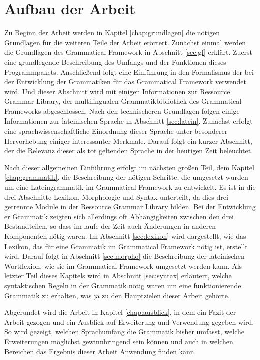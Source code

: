 \documentclass[fontsize=12pt,abstract=on,titlepage,bibliography=totoc,ngerman,listof=totoc]{scrreprt}
\begin{document}
\section{Aufbau der Arbeit}
\label{sec:aufbau}
Zu Beginn der Arbeit werden in Kapitel \ref{chap:grundlagen} die nötigen Grundlagen für die weiteren Teile der Arbeit erörtert. Zunächst einmal werden die Grundlagen des Grammatical Framework in Abschnitt \ref{sec:gf} erklärt. Zuerst eine grundlegende Beschreibung des Umfangs und der Funktionen dieses Programmpakets. Anschließend folgt eine Einführung in den Formalismus der bei der Entwicklung der Grammatiken für das Grammatical Framework verwendet wird. Und dieser Abschnitt wird mit einigen Informationen zur Ressource Grammar Library, der multilingualen Grammatikbibliothek des Grammatical Frameworks abgeschlossen. Nach den technischeren Grundlagen folgen einige Informationen zur lateinischen Sprache in Abschnitt \ref{sec:latein}. Zunächst erfolgt eine sprachwissenschaftliche Einordnung dieser Sprache unter besonderer Hervorhebung einiger interessanter Merkmale. Darauf folgt ein kurzer Abschnitt, der die Relevanz dieser als tot geltenden Sprache in der heutigen Zeit beleuchtet. \par
Nach dieser allgemeinen Einführung erfolgt im nächsten großen Teil, dem Kapitel \ref{chap:grammatik}, die Beschreibung der nötigen Schritte, die umgesetzt wurden um eine Lateingrammatik im Grammatical Framework zu entwickelt. Es ist in die drei Abschnitte Lexikon, Morphologie und Syntax unterteilt, da dies drei getrennte Module in der Ressource Grammar Library bilden. Bei der Entwicklung er Grammatik zeigten sich allerdings oft Abhängigkeiten zwischen den drei Bestandteilen, so dass im laufe der Zeit auch Änderungen in anderen Komponenten nötig waren. Im Abschnitt \ref{sec:lexikon} wird dargestellt, wie das Lexikon, das für eine Grammatik im Grammatical Framework nötig ist, erstellt wird. Darauf folgt in Abschnitt \ref{sec:morpho} die Beschreibung der lateinischen Wortflexion, wie sie im Grammatical Framework umgesetzt werden kann. Als letzter Teil dieses Kapitels wird in Abschnitt \ref{sec:syntax} erläutert, welche syntaktischen Regeln in der Grammatik nötig waren um eine funktionierende Grammatik zu erhalten, was ja zu den Hauptzielen dieser Arbeit gehörte. \par
Abgerundet wird die Arbeit in Kapitel \ref{chap:ausblick}, in dem ein Fazit der Arbeit gezogen und ein Ausblick auf Erweiterung und Verwendung gegeben wird. So wird gezeigt, welchen Sprachumfang die Grammatik bisher umfasst, welche Erweiterungen möglichst gewinnbringend sein können und auch in welchen Bereichen das Ergebnis dieser Arbeit Anwendung finden kann.
\pagebreak
\end{document}
